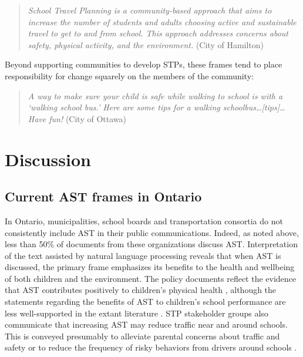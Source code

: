 \documentclass[preprint, 3p,
authoryear]{elsarticle} %
\begin{document}
\begin{quote}
\emph{School Travel Planning is a community-based approach that aims to
increase the number of students and adults choosing active and
sustainable travel to get to and from school. This approach addresses
concerns about safety, physical activity, and the environment.} (City of
Hamilton)
\end{quote}

Beyond supporting communities to develop STPs, these frames tend to
place responsibility for change squarely on the members of the
community:

\begin{quote}
\emph{A way to make sure your child is safe while walking to school is
with a `walking school bus.' Here are some tips for a walking
schoolbus\ldots{[}tips{]}\ldots Have fun!} (City of Ottawa)
\end{quote}

\hypertarget{discussion}{%
\section{Discussion}\label{discussion}}

\hypertarget{current-ast-frames-in-ontario}{%
\subsection{Current AST frames in
Ontario}\label{current-ast-frames-in-ontario}}

In Ontario, municipalities, school boards and transportation consortia
do not consistently include AST in their public communications. Indeed,
as noted above, less than 50\% of documents from these organizations
discuss AST. Interpretation of the text assisted by natural language
processing reveals that when AST is discussed, the primary frame
emphasizes its benefits to the health and wellbeing of both children and
the environment. The policy documents reflect the evidence that AST
contributes positively to children's physical health
\citep[see][]{faulknerActiveSchoolTransport2009, schoeppeAssociationsChildrenActive2015},
although the statements regarding the benefits of AST to children's
school performance are less well-supported in the extant literature
\citep{westmanTravelChildWellbeing2020}. STP stakeholder groups also
communicate that increasing AST may reduce traffic near and around
schools. This is conveyed presumably to alleviate parental concerns
about traffic and safety
\citep{eversParentSafetyPerceptions2014, mammenUnderstandingDriveEscort2012, rothmanAssociationsParentsPerception2015, wilsonUnderstandingChildParent2018}
or to reduce the frequency of risky behaviors from drivers around
schools \citep{rothmanSchoolEnvironmentStudent2017}.
\end{document}
